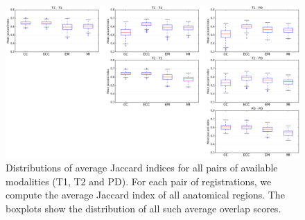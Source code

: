\begin{figure}[t!]
\centering
    \includegraphics[width=\linewidth]{./images/all_modality_pairs_boxplots.png}
    \caption{{\small Distributions of average Jaccard indices for all pairs of available modalities (T1, T2 and PD). For each pair of registrations, we compute the average Jaccard index of all anatomical regions. The boxplots show the distribution of all such average overlap scores.}}
\label{fig:all_pairs_boxplots}
\end{figure}

